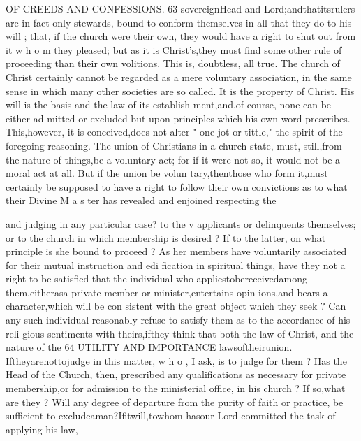 \documentclass[
]{book}
\begin{document}
OF CREEDS AND CONFESSIONS. 63
sovereignHead and Lord;andthatitsrulers
are in fact only stewards, bound to conform
themselves in all that they do to his will ; that,
if the church were their own, they would
have a right to shut out from it w h o m they
pleased; but as it is Christ's,they must find
some other rule of proceeding than their own
volitions. This is, doubtless, all true. The church of Christ certainly cannot be regarded
as a mere voluntary association, in the same
sense in which many other societies are so called. It is the property of Christ. His
will is the basis and the law of its establish
ment,and,of course, none can be either ad
mitted or excluded but upon principles which
his own word prescribes. This,however, it
is conceived,does not alter " one jot or tittle,"
the spirit of the foregoing reasoning. The union of Christians in a church state, must,
still,from the nature of things,be a voluntary act; for if it were not so, it would not be a moral act at all. But if the union be volun tary,thenthose who form it,must certainly be supposed to have a right to follow their own convictions as to what their Divine M a s ter has revealed and enjoined respecting the

and judging in any particular case? to the v applicants or delinquents themselves; or to the church in which membership is desired ?
If to the latter, on what principle is she bound
to proceed ? As her members have voluntarily associated for their mutual instruction and edi
fication in spiritual things, have they not a right to be satisfied that the individual who
appliestobereceivedamong them,eitherasa private member or minister,entertains opin ions,and bears a character,which will be con
sistent with the great object which they seek ? Can any such individual reasonably refuse to satisfy them as to the accordance of his reli gious sentiments with theirs,ifthey think that both the law of Christ, and the nature of the
64 UTILITY AND IMPORTANCE
lawsoftheirunion. Iftheyarenottojudge
in this matter, w h o , I ask, is to judge for them ? Has the Head of the Church, then,
prescribed any qualifications as necessary for private membership,or for admission to the
ministerial office, in his church ? If so,what are they ? Will any degree of departure from the purity of faith or practice, be sufficient to excludeaman?Ifitwill,towhom hasour Lord committed the task of applying his law,
\end{document}
